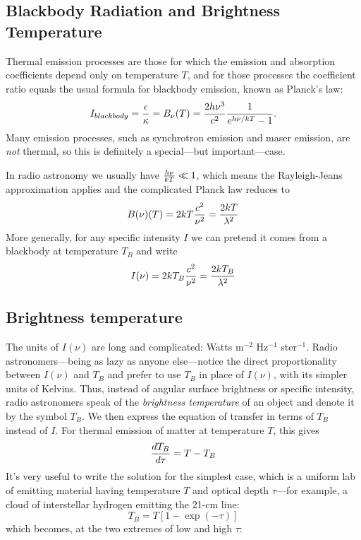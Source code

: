 \documentclass[12pt,psfig,preprint]{aastex}
\begin{document}
\subsection {Blackbody Radiation and Brightness Temperature}
Thermal emission processes are those for which the emission and
absorption coefficients depend only on temperature $T$, and for those
processes the coefficient ratio equals the usual formula for blackbody
emission, known as Planck's law:
%
\begin{equation}
I_{blackbody} = {\epsilon \over \kappa} = B_\nu(T) = 
{2h \nu^3 \over c^2} {1 \over e^{h\nu/kT} - 1}.
  \label{eq:planck}
\end{equation}
%
Many emission processes, such as synchrotron emission and
maser emission,  are {\it not} thermal, so this is definitely a
special---but important---case.

In radio astronomy we usually have ${h\nu \over kT} \ll 1$, which means
the Rayleigh-Jeans approximation applies and the complicated Planck law
reduces to
%
\begin{equation}
  B(\nu)(T) = 2 k T {c^2 \over \nu^2} = {2kT \over \lambda^2} 
  \label{eq:rjeans}
\end{equation}
% 
More generally, for any specific intensity $I$ we can pretend it comes
from a blackbody at temperature $T_B$ and write
%
\begin{equation}
  I(\nu) = 2 k T_B {c^2 \over \nu^2} = {2kT_B \over \lambda^2} 
  \label{eq:rjeans1}
\end{equation}
%



\subsection{Brightness temperature} \label{tb}

The units of $I(\nu)$ are long and complicated: Watts m$^{-2}$ Hz$^{-1}$
ster$^{-1}$. Radio astronomers---being as lazy as anyone else---notice
the direct proportionality between $I(\nu)$ and $T_B$ and prefer to use
$T_B$ in place of $I(\nu)$, with its simpler units of Kelvins.  Thus,
instead of angular surface brightness or specific intensity, radio
astronomers speak of the {\it brightness temperature} of an object and
denote it by the symbol $T_B$. We then express the equation of transfer
in terms of $T_B$ instead of $I$. For thermal emission of matter at
temperature $T$, this gives
%
\begin{equation} \label{tbeqn}
{dT_B \over d\tau} = T - T_B
\end{equation}
%
It's very useful to write the solution for the simplest case, which is a
uniform lab of emitting material having temperature $T$ and optical
depth $\tau$---for example, a cloud of interstellar hydrogen emitting
the 21-cm line:
%
\begin{equation} \label{tbeqn1}
T_B = T [1 - \exp(-\tau)] 
\end{equation}
%
which becomes, at the two extremes of low and high $\tau$:
\end{document}
